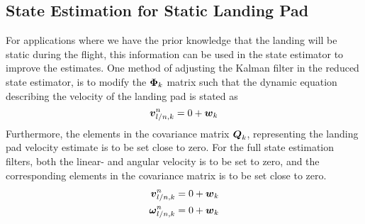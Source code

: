 \subsection{State Estimation for Static Landing Pad} %
\label{sub:state_estimation_for_static_landing_pad}
For applications where we have the prior knowledge that the landing will be static during the flight, this information can be used in the state estimator to improve the estimates. One method of adjusting the Kalman filter in the reduced state estimator, is to modify the $\boldsymbol{\Phi}_k$ matrix such that the dynamic equation describing the velocity of the landing pad is stated as
\begin{equation}
    \boldsymbol{v}_{l/n,k}^n=0+\boldsymbol{w}_k
\end{equation}
Furthermore, the elements in the covariance matrix $\boldsymbol{Q}_k$, representing the landing pad velocity estimate is to be set close to zero. For the full state estimation filters, both the linear- and angular velocity is to be set to zero, and the corresponding elements in the covariance matrix is to be set close to zero.
\begin{align}
    \boldsymbol{v}_{l/n,k}^n=0+\boldsymbol{w}_k\\
    \boldsymbol{\omega}_{l/n,k}^n=0+\boldsymbol{w}_k
\end{align}
